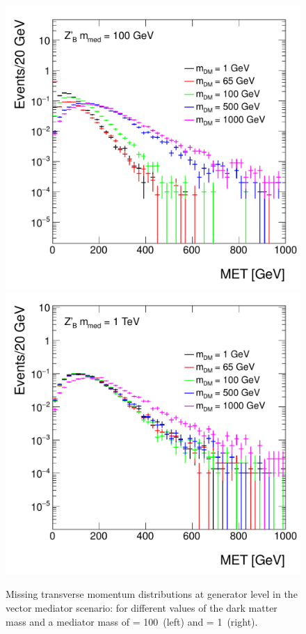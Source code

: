 \begin{figure}[htpb!]
	\centering
	\includegraphics[width=0.65\linewidth]{figures/EW/monoH/zprime_100_MET_et_Log}\\
	\includegraphics[width=0.65\linewidth]{figures/EW/monoH/zprime_1000_MET_et_Log}
	\caption{Missing transverse momentum distributions at generator level in the vector 
		mediator scenario: for different values of the dark matter mass \mDM 
		and a mediator mass of \mmed = 100~\gev (left) and \mmed = 1~\tev (right).
		\label{fig:metVectorMass} }
\end{figure}


